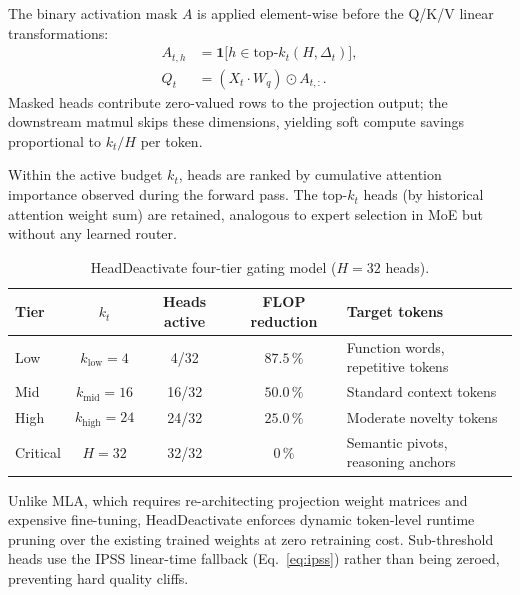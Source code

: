 \documentclass[11pt]{article}
\newcommand{\dsig}{\Delta}
\begin{document}
The binary activation mask $A$ is applied element-wise before the Q/K/V
linear transformations:
\begin{align}
  A_{t,h} &= \mathbf{1}\bigl[h \in \text{top-}k_t(H, \dsig_t)\bigr], \\
  Q_t     &= (X_t \cdot W_q) \odot A_{t,:}.
\end{align}
Masked heads contribute zero-valued rows to the projection output; the
downstream matmul skips these dimensions, yielding soft compute savings
proportional to $k_t / H$ per token.

Within the active budget $k_t$, heads are ranked by cumulative attention
importance observed during the forward pass. The top-$k_t$ heads (by
historical attention weight sum) are retained, analogous to expert selection
in MoE but without any learned router.

\begin{table}[H]
\centering
\small
\caption{HeadDeactivate four-tier gating model ($H{=}32$ heads).}
\label{tab:headdeact}
\begin{tabular}{lcccp{4.4cm}}
\toprule
Tier & $k_t$ & Heads active & FLOP reduction & Target tokens \\
\midrule
Low      & $k_{\mathrm{low}}{=}4$   & 4/32   & $87.5\,\%$ & Function words, repetitive tokens \\
Mid      & $k_{\mathrm{mid}}{=}16$  & 16/32  & $50.0\,\%$ & Standard context tokens \\
High     & $k_{\mathrm{high}}{=}24$ & 24/32  & $25.0\,\%$ & Moderate novelty tokens \\
Critical & $H{=}32$                 & 32/32  & $0\,\%$    & Semantic pivots, reasoning anchors \\
\bottomrule
\end{tabular}
\end{table}

Unlike MLA, which requires re-architecting projection weight matrices and
expensive fine-tuning, HeadDeactivate enforces dynamic token-level runtime
pruning over the existing trained weights at zero retraining cost.
Sub-threshold heads use the IPSS linear-time fallback (Eq.~\ref{eq:ipss})
rather than being zeroed, preventing hard quality cliffs.
\end{document}
